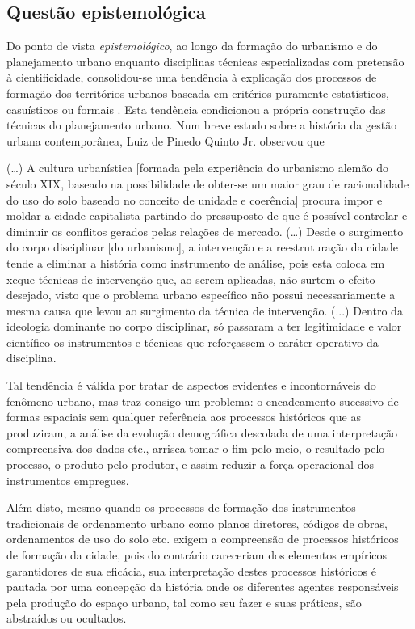 \subsection{Questão epistemológica}
\label{subsec:questepist}

Do ponto de vista \textit{epistemológico}, ao longo da formação do urbanismo e do planejamento urbano enquanto disciplinas técnicas especializadas com pretensão à cientificidade, consolidou-se uma tendência à explicação dos processos de formação dos territórios urbanos baseada em critérios puramente estatísticos, casuísticos ou formais \cite{benevolo_historia_1983, mumford_cidade_1998, hall_cidades_2007}. Esta tendência condicionou a própria construção das técnicas do planejamento urbano. Num breve estudo sobre a história da gestão urbana contemporânea, Luiz de Pinedo Quinto Jr. observou que 

\begin{citacao}
(…) A cultura urbanística [formada pela experiência do urbanismo alemão do século XIX, baseado na possibilidade de obter-se um maior grau de racionalidade do uso do solo baseado no conceito de unidade e coerência] procura impor e moldar a cidade capitalista partindo do pressuposto de que é possível controlar e diminuir os conflitos gerados pelas relações de mercado. (…) Desde o surgimento do corpo disciplinar [do urbanismo], a intervenção e a reestruturação da cidade tende a eliminar a história como instrumento de análise, pois esta coloca em xeque técnicas de intervenção que, ao serem aplicadas, não surtem o efeito desejado, visto que o problema urbano específico não possui necessariamente a mesma causa que levou ao surgimento da técnica de intervenção. (...) Dentro da ideologia dominante no corpo disciplinar, só passaram a ter legitimidade e valor científico os instrumentos e técnicas que reforçassem o caráter operativo da disciplina. \cite{QUINTOJR1990}
\end{citacao}

Tal tendência é válida por tratar de aspectos evidentes e incontornáveis do fenômeno urbano, mas traz consigo um problema: o encadeamento sucessivo de formas espaciais sem qualquer referência aos processos históricos que as produziram, a análise da evolução demográfica descolada de uma interpretação compreensiva dos dados etc., arrisca tomar o fim pelo meio, o resultado pelo processo, o produto pelo produtor, e assim reduzir a força operacional dos instrumentos empregues.

Além disto, mesmo quando os processos de formação dos instrumentos tradicionais de ordenamento urbano como planos diretores, códigos de obras, ordenamentos de uso do solo etc. exigem a compreensão de processos históricos de formação da cidade, pois do contrário careceriam dos elementos empíricos garantidores de sua eficácia, sua interpretação destes processos históricos é pautada por uma concepção da história onde os diferentes agentes responsáveis pela produção do espaço urbano, tal como seu fazer e suas práticas, são abstraídos ou ocultados. 


